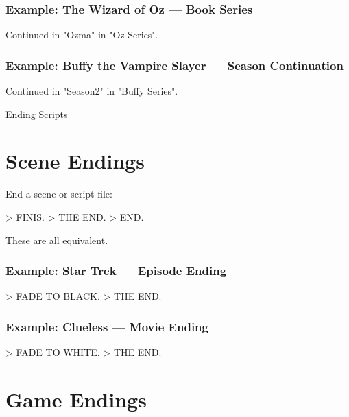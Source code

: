\documentclass[11pt,letterpaper,oldstylefigures]{memoir}
\makeatletter
\newenvironment{FountainExample}
  {\begingroup
  \ttfamily\small
   \setlength{\parindent}{0pt}
  \setlength{\parskip}{0.5em}
  \allowdisplaybreaks
  \setlength{\displaywidowpenalty}{0}
  \setlength{\widowpenalty}{0}
  \setlength{\clubpenalty}{0}
  \setlength{\interlinepenalty}{0}
}
  {\endgroup}
\newcommand{\sceneendcmd}[1]{\begin{flushright}\ttfamily #1\end{flushright}}
\let\oldchapter\chapter
\def\chapter{%
  \@ifstar
    {\FountainScripting@starchapter}%
    {\@dblarg\FountainScripting@chapter}}
\def\FountainScripting@starchapter#1{\oldchapter*{#1}\chaptermark{#1}}
\def\FountainScripting@chapter[#1]#2{\oldchapter[#1]{#2}\chaptermark{#2}}
\makeatother
\begin{document}
\subsubsection{Example: The Wizard of Oz — Book Series}
\begin{FountainExample}
Continued in "Ozma" in "Oz Series".
\end{FountainExample}

\subsubsection{Example: Buffy the Vampire Slayer — Season Continuation}
\begin{FountainExample}
Continued in "Season2" in "Buffy Series".
\end{FountainExample}

\chapter{Ending Scripts}

\section{Scene Endings}

End a scene or script file:

\begin{FountainExample}
> FINIS.
> THE END.
> END.
\end{FountainExample}

These are all equivalent.

\subsubsection{Example: Star Trek — Episode Ending}

\begin{FountainExample}
\sceneendcmd{> FADE TO BLACK. > THE END.}
\end{FountainExample}

\subsubsection{Example: Clueless — Movie Ending}

\begin{FountainExample}
\sceneendcmd{> FADE TO WHITE. > THE END.}
\end{FountainExample}

\section{Game Endings}
\end{document}
